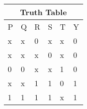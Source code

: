 \documentclass{article}
\begin{document}
\label{table:4}
\begin{tabular}{|p{1cm}|p{1cm}|p{1cm}|p{1cm}|p{1cm}|p{1cm}|}                                                         
	\hline                                               
	\multicolumn{6}{|c|}{Truth Table}\\                                                                      
	\hline                                               
	P& Q& R& S& T& Y\\                                                                                       
	\hline                                               
	x& x& 0& x& x& 0\\                                                                                       
	\hline                                               
	x& x& x& 0& x& 0\\                                                                                       
	\hline                                               
	0& 0& x& x& 1& 0\\                                                                                       
	\hline                                               
	x& x& 1& 1& 0& 1\\                                                                                       
	\hline                                               
	1& 1& 1& 1& x& 1\\                                                                                       
	\hline                                      
\end{tabular}
\end{document}
